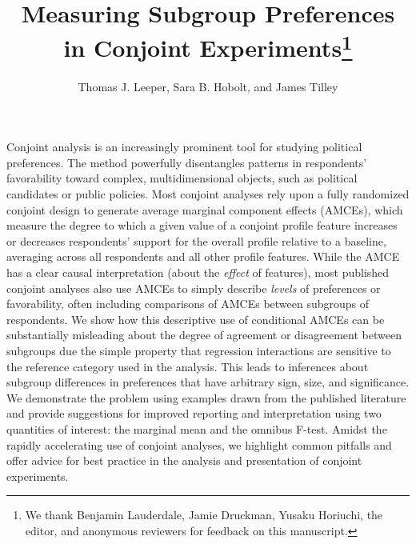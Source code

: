 \documentclass[a4paper,12pt]{article}\usepackage[]{graphicx}\usepackage[]{color}
\title{Measuring Subgroup Preferences in Conjoint Experiments\footnote{We thank Benjamin Lauderdale, Jamie Druckman, Yusaku Horiuchi, the editor, and anonymous reviewers for feedback on this manuscript.}}
\author{Thomas J. Leeper, Sara B. Hobolt, and James Tilley}
\begin{document}
\maketitle

{\abstract Conjoint analysis is an increasingly prominent tool for studying political preferences. The method powerfully disentangles patterns in respondents' favorability toward complex, multidimensional objects, such as political candidates or public policies. Most conjoint analyses rely upon a fully randomized conjoint design to generate average marginal component effects (AMCEs), which measure the degree to which a given value of a conjoint profile feature increases or decreases respondents' support for the overall profile relative to a baseline, averaging across all respondents and all other profile features. While the AMCE has a clear causal interpretation (about the \textit{effect} of features), most published conjoint analyses also use AMCEs to simply describe \textit{levels} of preferences or favorability, often including comparisons of AMCEs between subgroups of respondents. We show how this descriptive use of conditional AMCEs can be substantially misleading about the degree of agreement or disagreement between subgroups due the simple property that regression interactions are sensitive to the reference category used in the analysis. This leads to inferences about subgroup differences in preferences that have arbitrary sign, size, and significance. We demonstrate the problem using examples drawn from the published literature and provide suggestions for improved reporting and interpretation using two quantities of interest: the marginal mean and the omnibus F-test. Amidst the rapidly accelerating use of conjoint analyses, we highlight common pitfalls and offer advice for best practice in the analysis and presentation of conjoint experiments.}


















\clearpage
\end{document}
